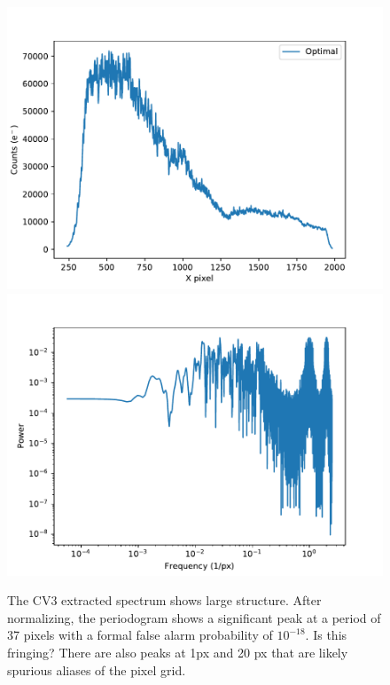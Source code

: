 \documentclass{aastex62}
\begin{document}
\begin{figure}[!hbtp]
\centering
\includegraphics[width=.49\columnwidth]{labLED_ind_spec_CV3NRCN036810.pdf}
\includegraphics[width=.49\columnwidth]{labLED_spec_periodo_CV3NRCN036810.pdf}
\caption{The CV3 extracted spectrum shows large structure.
After normalizing, the periodogram shows a significant peak at a period of 37 pixels with a formal false alarm probability of $10^{-18}$.
Is this fringing?
There are also peaks at 1px and 20 px that are likely spurious aliases of the pixel grid.}\label{fig:cv3ExtractedSpectrum}
\end{figure}


%

\vspace{5mm}

\end{document}
